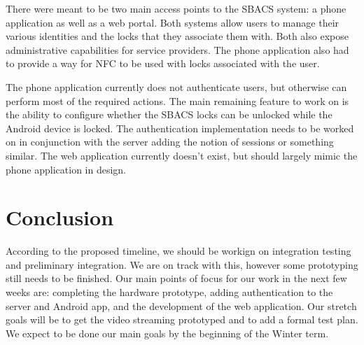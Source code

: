 \documentclass{article}
\begin{document}
There were meant to be two main access points to the SBACS system: a phone application as well as a web portal. Both
systems allow users to manage their various identities and the locks that they associate them with. Both also expose
administrative capabilities for service providers. The phone application also had to provide a way for NFC to be used
with locks associated with the user.

The phone application currently does not authenticate users, but otherwise can perform most of the required actions.
The main remaining feature to work on is the ability to configure whether the SBACS locks can be unlocked while the
Android device is locked. The authentication implementation needs to be worked on in conjunction with the server adding
the notion of sessions or something similar. The web application currently doesn't exist, but should largely mimic the
phone application in design.

\section{Conclusion}

According to the proposed timeline, we should be workign on integration testing and preliminary integration. We are on
track with this, however some prototyping still needs to be finished. Our main points of focus for our work in the next
few weeks are: completing the hardware prototype, adding authentication to the server and Android app, and the
development of the web application. Our stretch goals will be to get the video streaming prototyped and to add a formal
test plan. We expect to be done our main goals by the beginning of the Winter term.
\end{document}
